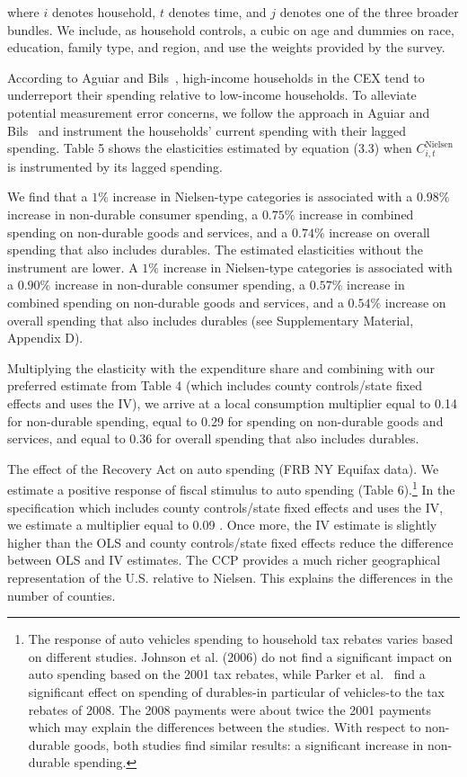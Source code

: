 \documentclass[\latexroot/\projectname]{subfiles}
\begin{document}
where $i$ denotes household, $t$ denotes time, and $j$ denotes one of the three broader bundles. We include, as household controls, a cubic on age and dummies on race, education, family type, and region, and use the weights provided by the survey.

According to Aguiar and Bils~\cite{Aguiar2015-ij}, high-income households in the CEX tend to underreport their spending relative to low-income households. To alleviate potential measurement error concerns, we follow the approach in Aguiar and Bils~\cite{Aguiar2015-ij} and instrument the households' current spending with their lagged spending. Table 5 shows the elasticities estimated by equation (3.3) when $C_{i, t}^{\text {Nielsen }}$ is instrumented by its lagged spending.

We find that a $1 \%$ increase in Nielsen-type categories is associated with a $0.98 \%$ increase in non-durable consumer spending, a $0.75 \%$ increase in combined spending on non-durable goods and services, and a $0.74 \%$ increase on overall spending that also includes durables. The estimated elasticities without the instrument are lower. A $1 \%$ increase in Nielsen-type categories is associated with a $0.90 \%$ increase in non-durable consumer spending, a $0.57 \%$ increase in combined spending on non-durable goods and services, and a $0.54 \%$ increase on overall spending that also includes durables (see Supplementary Material, Appendix D).

Multiplying the elasticity with the expenditure share and combining with our preferred estimate from Table 4 (which includes county controls/state fixed effects and uses the IV), we arrive at a local consumption multiplier equal to 0.14 for non-durable spending, equal to 0.29 for spending on non-durable goods and services, and equal to 0.36 for overall spending that also includes durables.



The effect of the Recovery Act on auto spending (FRB NY Equifax data). We estimate a positive response of fiscal stimulus to auto spending (Table 6).\footnote{The response of auto vehicles spending to household tax rebates varies based on different studies. Johnson et al. (2006) do not find a significant impact on auto spending based on the 2001 tax rebates, while Parker et al.~\cite{Parker2013-py} find a significant effect on spending of durables-in particular of vehicles-to the tax rebates of 2008. The 2008 payments were about twice the 2001 payments which may explain the differences between the studies. With respect to non-durable goods, both studies find similar results: a significant increase in non-durable spending.} In the specification which includes county controls/state fixed effects and uses the IV, we estimate a multiplier equal to 0.09 . Once more, the IV estimate is slightly higher than the OLS and county controls/state fixed effects reduce the difference between OLS and IV estimates. The CCP provides a much richer geographical representation of the U.S. relative to Nielsen. This explains the differences in the number of counties.
\end{document}
